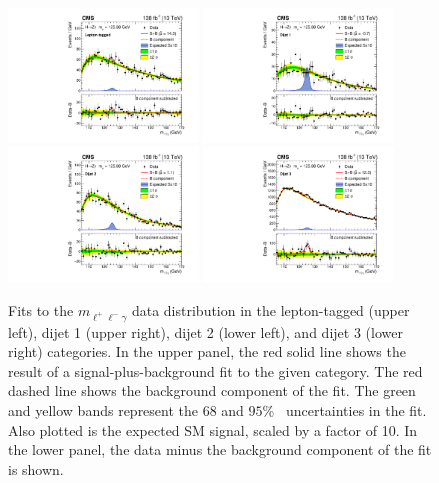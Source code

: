 \begin{figure}
  \centering
  \includegraphics[width=0.45\textwidth]{fig/results/Figure_008.pdf}
  \includegraphics[width=0.45\textwidth]{fig/results/Figure_004-a.pdf}\\
  \includegraphics[width=0.45\textwidth]{fig/results/Figure_004-b.pdf}
  \includegraphics[width=0.45\textwidth]{fig/results/Figure_004-c.pdf}\\
   \caption{Fits to the $m_{\ell^+\ell^-\gamma}$ data distribution
    in the lepton-tagged (upper left), dijet 1 (upper right), dijet 2 (lower left), and
  dijet 3 (lower right) categories.
  In the upper panel, the red solid line shows the result of a signal-plus-background fit to the given category.
  The red dashed line shows the background component of the fit.
  The green and yellow bands represent the $68$ and $95$\% \CL\ uncertainties in the fit.
  Also plotted is the expected SM signal, scaled by a factor of 10.
  In the lower panel, the data minus the background component of the fit is shown. \label{fig:3}}
  \end{figure}


